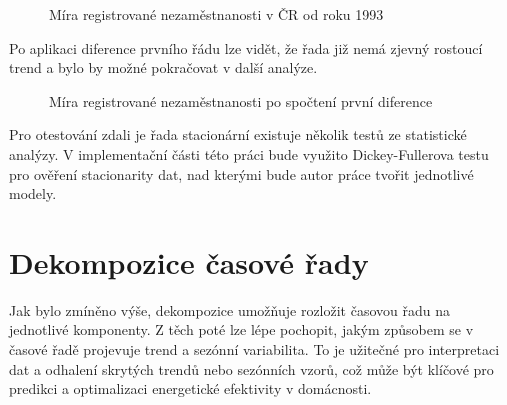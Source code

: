 \documentclass[FM,BP,fonts]{tulthesis}
\begin{document}
\begin{figure}[htbp]
	\centering
	\caption{Míra registrované nezaměstnanosti v ČR od roku 1993 }
	\label{fig:nezamestnanost}
\end{figure}

Po aplikaci diference prvního řádu lze vidět, že řada již nemá zjevný rostoucí trend a bylo by možné pokračovat v další analýze.

\begin{figure}[htbp]
	\centering
	\caption{Míra registrované nezaměstnanosti po spočtení první diference }
	\label{fig:nezamestnanost_diff}
\end{figure}

Pro otestování zdali je řada stacionární existuje několik testů ze statistické analýzy. V implementační části této práci bude využito Dickey-Fullerova testu pro ověření stacionarity dat, nad kterými bude autor práce tvořit jednotlivé modely. 


\section{Dekompozice časové řady}
Jak bylo zmíněno výše, dekompozice umožňuje rozložit časovou řadu na jednotlivé komponenty. Z těch poté lze lépe pochopit, jakým způsobem se v časové řadě projevuje trend a sezónní variabilita. To je užitečné pro interpretaci dat a odhalení skrytých trendů nebo sezónních vzorů, což může být klíčové pro predikci a optimalizaci energetické efektivity v domácnosti.
\end{document}
